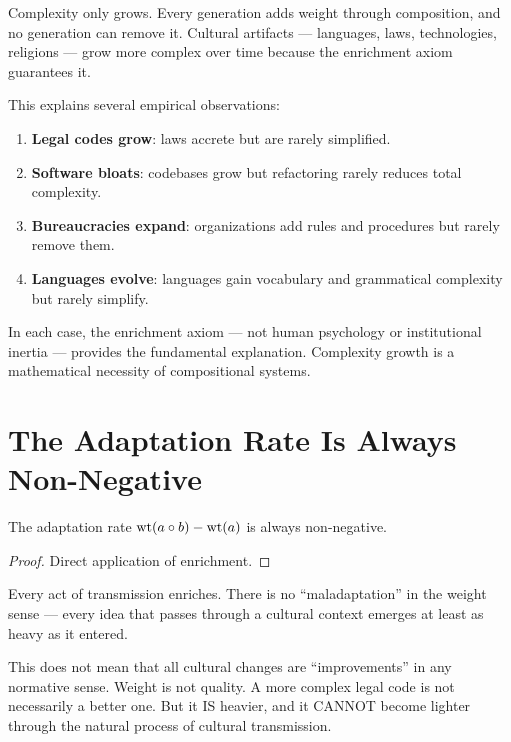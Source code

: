 \begin{paradox}
Complexity only grows. Every generation adds weight through composition, and no generation can remove it. Cultural artifacts --- languages, laws, technologies, religions --- grow more complex over time because the enrichment axiom guarantees it.

This explains several empirical observations:
\begin{enumerate}
\item \textbf{Legal codes grow}: laws accrete but are rarely simplified.
\item \textbf{Software bloats}: codebases grow but refactoring rarely reduces total complexity.
\item \textbf{Bureaucracies expand}: organizations add rules and procedures but rarely remove them.
\item \textbf{Languages evolve}: languages gain vocabulary and grammatical complexity but rarely simplify.
\end{enumerate}

In each case, the enrichment axiom --- not human psychology or institutional inertia --- provides the fundamental explanation. Complexity growth is a mathematical necessity of compositional systems.
\end{paradox}

\section{The Adaptation Rate Is Always Non-Negative}

\begin{theorem}
\label{thm:adaptation-positive}
The adaptation rate $\operatorname{wt}(a \circ b) - \operatorname{wt}(a)$ is always non-negative.
\end{theorem}

\begin{proof}
Direct application of enrichment.
\end{proof}

\begin{interpretation}
Every act of transmission enriches. There is no ``maladaptation'' in the weight sense --- every idea that passes through a cultural context emerges at least as heavy as it entered.

This does not mean that all cultural changes are ``improvements'' in any normative sense. Weight is not quality. A more complex legal code is not necessarily a better one. But it IS heavier, and it CANNOT become lighter through the natural process of cultural transmission.
\end{interpretation}

